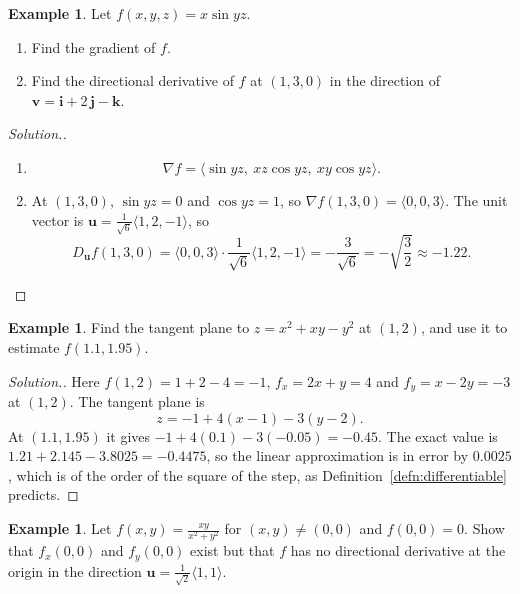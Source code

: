 \documentclass[11pt,a4paper]{article}
\theoremstyle{definition}
\newtheorem{exa}[thm]{Example}
\newenvironment{solution}
  {\renewcommand{\qedsymbol}{}\begin{proof}[\textit{Solution}.]}
  {\end{proof}}
\begin{document}
\begin{exa}
\label{ex:dir3}
Let $f(x,y,z) = x\sin yz$.
\begin{enumerate}
\item Find the gradient of $f$.

\item Find the directional derivative of $f$ at $(1,3,0)$ in the direction of
$\mathbf v = \mathbf i + 2\,\mathbf j -\mathbf k$.
\end{enumerate}
\end{exa}

\begin{solution}
\begin{enumerate}
\item
\[\nabla f = \langle \sin yz,\ xz\cos yz,\ xy\cos yz\rangle .\]

\item At $(1,3,0)$, $\sin yz = 0$ and $\cos yz = 1$, so
$\nabla f(1,3,0) = \langle 0, 0, 3\rangle$. The unit vector is
$\mathbf u = \frac{1}{\sqrt{6}}\langle 1, 2, -1\rangle$, so
\[D_{\mathbf u} f(1,3,0) = \langle 0,0,3\rangle\cdot\frac{1}{\sqrt6}\langle
1,2,-1\rangle = -\frac{3}{\sqrt6} = -\sqrt{\frac{3}{2}}\approx -1.22 .\]
\end{enumerate}
\end{solution}

\begin{exa}
\label{ex:tangentplane}
Find the tangent plane to $z = x^2 + xy - y^2$ at $(1,2)$, and use it to estimate
$f(1.1, 1.95)$.
\end{exa}

\begin{solution}
Here $f(1,2) = 1 + 2 - 4 = -1$, $f_x = 2x + y = 4$ and $f_y = x - 2y = -3$ at
$(1,2)$. The tangent plane is
\[z = -1 + 4(x-1) - 3(y-2).\]
At $(1.1,1.95)$ it gives $-1 + 4(0.1) - 3(-0.05) = -0.45$. The exact value is
$1.21 + 2.145 - 3.8025 = -0.4475$, so the linear approximation is in error by
$0.0025$, which is of the order of the square of the step, as
Definition~\ref{defn:differentiable} predicts.
\end{solution}

\begin{exa}
\label{ex:notdifferentiable}
Let $f(x,y) = \frac{xy}{x^2+y^2}$ for $(x,y)\neq(0,0)$ and $f(0,0) = 0$. Show
that $f_x(0,0)$ and $f_y(0,0)$ exist but that $f$ has no directional derivative
at the origin in the direction $\mathbf u = \frac{1}{\sqrt2}\langle 1,1\rangle$.
\end{exa}
\end{document}
